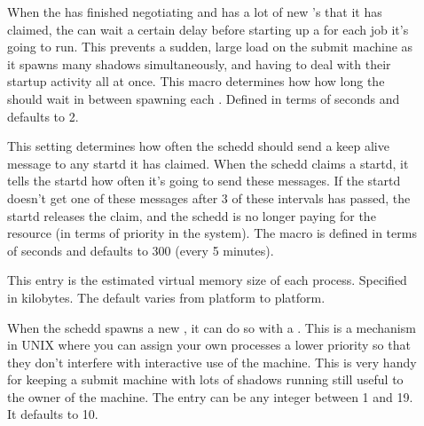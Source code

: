 \begin{description}
\item[] \label{param:JobStartDelay} When the
   has finished negotiating and has a lot of new
  's that it has claimed, the  can wait
  a certain delay before starting up a  for each job
  it's going to run.  This prevents a sudden, large load on the submit
  machine as it spawns many shadows simultaneously, and having to deal
  with their startup activity all at once.  This macro determines how
  how long the  should wait in between spawning each
  .  Defined in terms of seconds and defaults to 2. 
  
\item[] \label{param:AliveInterval} This
  setting determines how often the schedd should send a keep alive
  message to any startd it has claimed.  When the schedd claims a
  startd, it tells the startd how often it's going to send these
  messages.  If the startd doesn't get one of these messages after 3
  of these intervals has passed, the startd releases the claim, and
  the schedd is no longer paying for the resource (in terms of
  priority in the system).  The macro is defined in terms of seconds
  and defaults to 300 (every 5 minutes).

\item[] \label{param:ShadowSizeEstimate}
  This entry is the estimated virtual memory size of each
   process.  Specified in kilobytes.  The default
  varies from platform to platform.

\item[]
  \label{param:ShadowReniceIncrement} When the schedd spawns a new
  , it can do so with a .  This is a
  mechanism in UNIX where you can assign your own processes a lower 
  priority so that they don't interfere with interactive use of the
  machine.  This is very handy for keeping a submit machine with lots
  of shadows running still useful to the owner of the machine.  The
  entry can be any integer between 1 and 19.  It defaults to 10.


\end{description}
